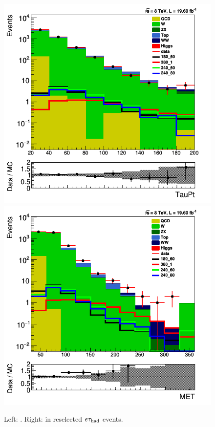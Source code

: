 \begin{figure}[!Hhtb]
\centering
\includegraphics[angle=0,scale=0.35]{SelectionEleTau/TauPt.png}
\includegraphics[angle=0,scale=0.35]{SelectionEleTau/MET.png}
\caption{Left: \Tau\PT. Right: \MPT in reselected $e\tau_{\rm had}$ events.}
\label{fig:datamceletau}
\end{figure}

